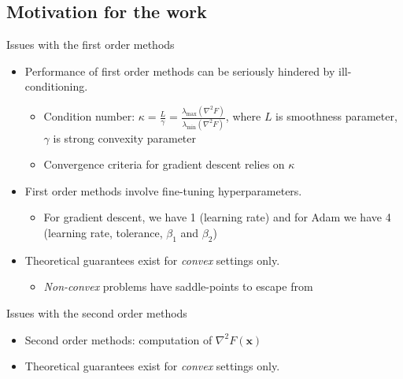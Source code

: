 \documentclass[10pt]{beamer}
\newcommand{\h}{\nabla^{2}}
\newcommand{\xbold}{\mathbf{x}}
\newcommand{\mineig}{\lambda_{\min}}
\newcommand{\maxeig}{\lambda_{\max}}
\begin{document}
\subsection{Motivation for the work}
\begin{frame}{Issues with the first order methods}
  \begin{itemize}
  \item<1->{
    Performance of first order methods can be seriously hindered by ill-conditioning.
    \begin{itemize}    
        \item<2->{Condition number: \(\kappa = \frac{L}{\gamma} = \frac{\maxeig(\h F)}{\mineig(\h F)}\), where \(L\) is smoothness parameter, \(\gamma\) is strong convexity parameter}
        \item<3->{Convergence criteria for gradient descent relies on \(\kappa\)} %
    \end{itemize}
  }
  \item<4->{
    First order methods involve fine-tuning hyperparameters.
    \begin{itemize}    
        \item<5->{For gradient descent, we have 1 (learning rate) and for Adam we have 4 (learning rate, tolerance, \(\beta_{1}\) and \(\beta_{2}\))}
    \end{itemize}
  }
  \item<6->{
    Theoretical guarantees exist for \emph{convex} settings only.
    \begin{itemize}    
        \item<7->{\emph{Non-convex} problems have saddle-points to escape from}
    \end{itemize}
  }
  \end{itemize}
\end{frame}

\begin{frame}{Issues with the second order methods}
  \begin{itemize}
  \item<1-> {
    Second order methods: computation of \(\h F(\xbold)\)
    \begin{itemize}
    \end{itemize}
  }
  \item<4->{
    Theoretical guarantees exist for \emph{convex} settings only.
  } %
  \end{itemize}
\end{frame}
\end{document}
